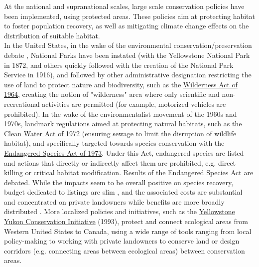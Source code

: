 At the national and supranational scales, large scale conservation policies have been implemented, using protected areas. These policies aim at protecting habitat to foster population recovery, as well as mitigating climate change effects on the distribution of suitable habitat. \\
In the United States, in the wake of the environmental conservation/preservation debate \citep{Banzhaf2019}, National Parks have been instated (with the Yellowstone National Park in 1872, and others quickly followed with the creation of the National Park Service in 1916), and followed by other administrative designation restricting the use of land to protect nature and biodiversity, such as the \href{https://www.fs.usda.gov/Internet/FSE_DOCUMENTS/fseprd645666.pdf}{Wilderness Act of 1964}, creating the notion of "wilderness" area where only scientific and non-recreational activities are permitted (for example, motorized vehicles are prohibited). In the wake of the environmentalist movement of the 1960s and 1970s, landmark regulations aimed at protecting natural habitats, such as the \href{https://www.epa.gov/laws-regulations/summary-clean-water-act}{Clean Water Act of 1972} (ensuring sewage to limit the disruption of wildlife habitat), and specifically targeted towards species conservation with the \href{https://www.fws.gov/sites/default/files/documents/endangered-species-act-accessible.pdf}{Endangered Species Act of 1973}. Under this Act, endangered species are listed and actions that directly or indirectly affect them are prohibited, e.g. direct killing or critical habitat modification. Results of the Endangered Species Act are debated. While the impacts seem to be overall positive on species recovery, budget dedicated to listings are slim , and the associated costs are substantial and concentrated on private landowners while benefits are more broadly distributed \citep{brown_economics_1998, langpap_economics_2018}. More localized policies and initiatives, such as the \href{https://y2y.net/}{Yellowstone Yukon Conservation Initiative} (1993), protect and connect ecological areas from Western United States to Canada, using a wide range of tools ranging from local policy-making to working with private landowners to conserve land or design corridors (e.g. connecting areas between ecological areas) between conservation areas.
\\
